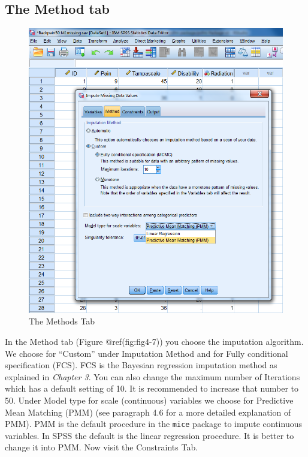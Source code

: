 \documentclass[
]{book}
\begin{document}
\hypertarget{the-method-tab}{%
\subsection{The Method tab}\label{the-method-tab}}

\begin{figure}

{\centering \includegraphics[width=0.9\linewidth]{images/fig4.7} 

}

\caption{The Methods Tab}\label{fig:fig4-7}
\end{figure}

In the Method tab (Figure @ref(fig:fig4-7)) you choose the imputation
algorithm. We choose for ``Custom'' under Imputation Method and for
Fully conditional specification (FCS). FCS is the Bayesian regression
imputation method as explained in \emph{Chapter 3}. You can also change
the maximum number of Iterations which has a default setting of 10. It
is recommended to increase that number to 50. Under Model type for scale
(continuous) variables we choose for Predictive Mean Matching (PMM) (see
paragraph 4.6 for a more detailed explanation of PMM). PMM is the
default procedure in the \texttt{mice} package to impute continuous
variables. In SPSS the default is the linear regression procedure. It is
better to change it into PMM. Now visit the Constraints Tab.
\end{document}
